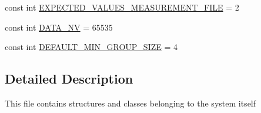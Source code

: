 \begin{DoxyCompactItemize}
\item 
const int \hyperlink{namespace_p_r_p_s_evolution_a5f7e46953736ee6382e8eb482f78e366}{\-E\-X\-P\-E\-C\-T\-E\-D\-\_\-\-V\-A\-L\-U\-E\-S\-\_\-\-M\-E\-A\-S\-U\-R\-E\-M\-E\-N\-T\-\_\-\-F\-I\-L\-E} = 2
\item 
const int \hyperlink{namespace_p_r_p_s_evolution_a55671646df338188f3fd8f1f30226b25}{\-D\-A\-T\-A\-\_\-\-N\-V} = 65535
\item 
const int \hyperlink{namespace_p_r_p_s_evolution_a578fcad2da213d6bae4f962fb90babd6}{\-D\-E\-F\-A\-U\-L\-T\-\_\-\-M\-I\-N\-\_\-\-G\-R\-O\-U\-P\-\_\-\-S\-I\-Z\-E} = 4
\end{DoxyCompactItemize}


\subsection{\-Detailed \-Description}
\-This file contains structures and classes belonging to the system itself 

